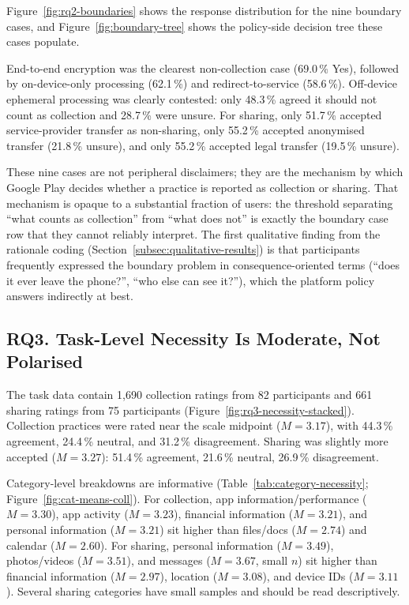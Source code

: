 \documentclass[11pt,a4paper]{article}
\begin{document}
Figure~\ref{fig:rq2-boundaries} shows the response distribution for the
nine boundary cases, and Figure~\ref{fig:boundary-tree} shows the
policy-side decision tree these cases populate.


 End-to-end encryption
was the clearest non-collection case (69.0\,\% Yes), followed by
on-device-only processing (62.1\,\%) and redirect-to-service (58.6\,\%).
Off-device ephemeral processing was clearly contested: only 48.3\,\%
agreed it should not count as collection and 28.7\,\% were unsure. For
sharing, only 51.7\,\% accepted service-provider transfer as
non-sharing, only 55.2\,\% accepted anonymised transfer (21.8\,\%
unsure), and only 55.2\,\% accepted legal transfer (19.5\,\% unsure).

These nine cases are not peripheral disclaimers; they are the mechanism
by which Google Play decides whether a practice is reported as
collection or sharing. That mechanism is opaque to a substantial
fraction of users: the threshold separating ``what counts as
collection'' from ``what does not'' is exactly the boundary case row
that they cannot reliably interpret. The first qualitative finding from
the rationale coding (Section~\ref{subsec:qualitative-results}) is that
participants frequently expressed the boundary problem in
consequence-oriented terms (``does it ever leave the phone?'', ``who
else can see it?''), which the platform policy answers indirectly at
best.

\subsection{RQ3. Task-Level Necessity Is Moderate, Not Polarised}
\label{subsec:rq3-task-necessity}

The task data contain 1{,}690 collection ratings from 82 participants
and 661 sharing ratings from 75 participants
(Figure~\ref{fig:rq3-necessity-stacked}). Collection practices were
rated near the scale midpoint ($M=3.17$), with 44.3\,\% agreement,
24.4\,\% neutral, and 31.2\,\% disagreement. Sharing was slightly more
accepted ($M=3.27$): 51.4\,\% agreement, 21.6\,\% neutral, 26.9\,\%
disagreement.




Category-level breakdowns are informative
(Table~\ref{tab:category-necessity}; Figure~\ref{fig:cat-means-coll}).
For collection, app information/performance ($M=3.30$), app activity
($M=3.23$), financial information ($M=3.21$), and personal information
($M=3.21$) sit higher than files/docs ($M=2.74$) and calendar
($M=2.60$). For sharing, personal information ($M=3.49$), photos/videos
($M=3.51$), and messages ($M=3.67$, small $n$) sit higher than financial
information ($M=2.97$), location ($M=3.08$), and device IDs
($M=3.11$). Several sharing categories have small samples and should be
read descriptively.
\end{document}

